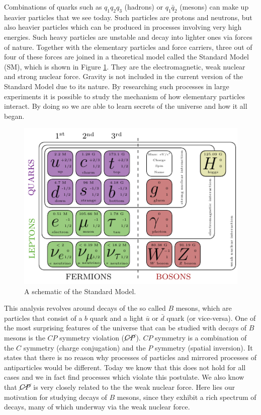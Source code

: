 \documentclass[headings=standardclasses,headings=big,oneside,a4paper,openany,12pt]{scrbook}
\begin{document}
Combinations of quarks such as $q_1 q_2 q_3$ (hadrons) or $q_1 \bar{q}_2$ (mesons) can make up heavier particles that we see today. Such particles are protons and neutrons, but also heavier particles which can be produced in processes involving very high energies. Such heavy particles are unstable and decay into lighter ones via forces of nature. Together with the elementary particles and force carriers, three out of four of these forces are joined in a theoretical model called the Standard Model (SM), which is shown in Figure \ref{fig:sm}. They are the electromagnetic, weak nuclear and strong nuclear force. Gravity is not included in the current version of the Standard Model due to its nature. By researching such processes in large experiments it is possible to study the mechanism of how elementary particles interact. By doing so we are able to learn secrets of the universe and how it all began.

\begin{figure}[H]
\centering
\includegraphics[scale=1.6]{texfig/SM}
\captionsetup{width=.8\linewidth}
\caption{A schematic of the Standard Model.}
\label{fig:sm}
\end{figure}

This analysis revolves around decays of the so called $B$ mesons, which are particles that consist of a $b$ quark and a light $\bar u$ or $\bar d$ quark (or vice-versa). One of the most surprising features of the universe that can be studied with decays of $B$ mesons is the $CP$ symmetry violation ($\cancel{CP}$). $CP$ symmetry is a combination of the $C$ symmetry (charge conjugation) and the $P$ symmetry (spatial inversion). It states that there is no reason why processes of particles and mirrored processes of antiparticles would be different. Today we know that this does not hold for all cases and we in fact find processes which violate this postulate. We also know that $\cancel{CP}$ is very closely related to the the weak nuclear force. Here lies our motivation for studying decays of $B$ mesons, since they exhibit a rich spectrum of decays, many of which underway via the weak nuclear force.
\end{document}
